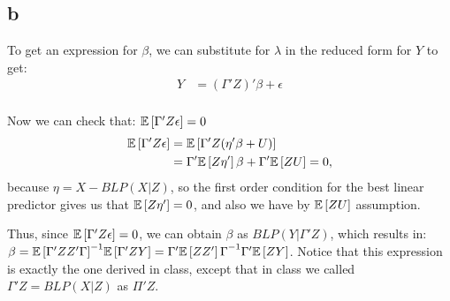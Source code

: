 \documentclass[12pt]{paper}
\begin{document}
\subsection*{b}

To get an expression for $\beta$, we can substitute for $\lambda$ in the reduced form for $Y$ to get:
\begin{align*}
Y&=(\Gamma'Z)'\beta+\epsilon\\
\end{align*}

Now we can check that: $\mathbb{E} \left [ \Gamma'Z\epsilon \right ]=0$
\begin{align*}
\mathbb{E} \left [ \Gamma'Z\epsilon \right ]&=\mathbb{E} \left [ \Gamma'Z(\eta'\beta+U) \right ]\\
&=\Gamma'\mathbb{E} \left [ Z\eta' \right ]\beta+\Gamma'\mathbb{E} \left [ ZU \right ]=0,
\end{align*}
\noindent because $\eta=X-BLP(X|Z)$, so the first order condition for the best linear predictor gives us that $\mathbb{E} \left [ Z\eta' \right ]=0$, and also we have by $\mathbb{E} \left [ ZU \right ]$ assumption.

Thus, since $\mathbb{E} \left [ \Gamma'Z\epsilon \right ]=0$, we can obtain $\beta$ as $BLP(Y|\Gamma'Z)$, which results in: $\beta={\mathbb{E} \left [ \Gamma'ZZ'\Gamma \right ]}^{-1}\mathbb{E} \left [ \Gamma'ZY \right ]={\Gamma'\mathbb{E} \left [ ZZ' \right ]\Gamma}^{-1}\Gamma'\mathbb{E} \left [ ZY \right ]$. Notice that this expression is exactly the one derived in class, except that in class we called $\Gamma'Z=BLP(X|Z)$ as $\Pi'Z$.
\end{document}
